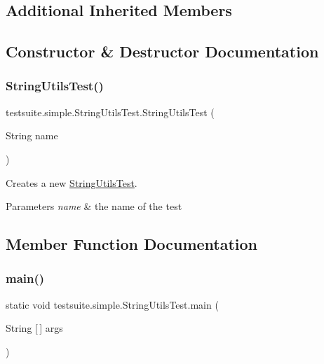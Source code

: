\subsection*{Additional Inherited Members}


\subsection{Constructor \& Destructor Documentation}
\mbox{\label{classtestsuite_1_1simple_1_1_string_utils_test_a566d21caf24b123669b3bb7bdbba4e88}} 
\subsubsection{\texorpdfstring{String\+Utils\+Test()}{StringUtilsTest()}}
{\footnotesize\ttfamily testsuite.\+simple.\+String\+Utils\+Test.\+String\+Utils\+Test (\begin{DoxyParamCaption}\item[{String}]{name }\end{DoxyParamCaption})}

Creates a new \mbox{\hyperlink{classtestsuite_1_1simple_1_1_string_utils_test}{String\+Utils\+Test}}.


\begin{DoxyParams}{Parameters}
{\em name} & the name of the test \\
\hline
\end{DoxyParams}


\subsection{Member Function Documentation}
\mbox{\label{classtestsuite_1_1simple_1_1_string_utils_test_ac9e9be272333ccff488a510777242c77}} 
\subsubsection{\texorpdfstring{main()}{main()}}
{\footnotesize\ttfamily static void testsuite.\+simple.\+String\+Utils\+Test.\+main (\begin{DoxyParamCaption}\item[{String \mbox{[}$\,$\mbox{]}}]{args }\end{DoxyParamCaption})\hspace{0.3cm}{\ttfamily [static]}}

